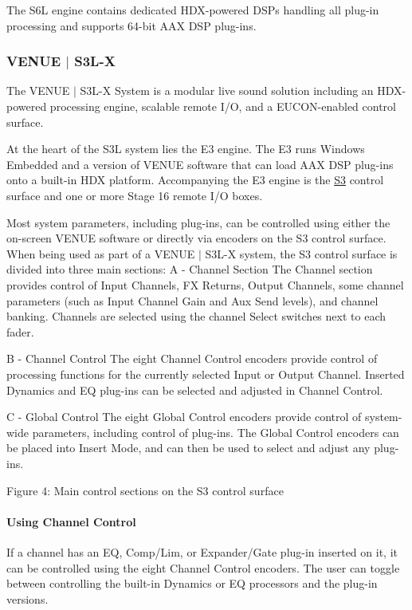  The S6\+L engine contains dedicated H\+D\+X-\/powered D\+S\+Ps handling all plug-\/in processing and supports 64-\/bit A\+A\+X D\+S\+P plug-\/ins.

\hypertarget{a00377_aax_venue_guide__systems__s3l}{}\subsubsection{V\+E\+N\+U\+E $\vert$ S3\+L-\/\+X}\label{a00377_aax_venue_guide__systems__s3l}
 The V\+E\+N\+U\+E $\vert$ S3\+L-\/\+X System is a modular live sound solution including an H\+D\+X-\/powered processing engine, scalable remote I/\+O, and a E\+U\+C\+O\+N-\/enabled control surface.

 At the heart of the S3\+L system lies the E3 engine. The E3 runs Windows Embedded and a version of V\+E\+N\+U\+E software that can load A\+A\+X D\+S\+P plug-\/ins onto a built-\/in H\+D\+X platform. Accompanying the E3 engine is the \hyperlink{a00363_subsubsection__avid_s3}{S3} control surface and one or more Stage 16 remote I/\+O boxes.

 Most system parameters, including plug-\/ins, can be controlled using either the on-\/screen V\+E\+N\+U\+E software or directly via encoders on the S3 control surface. When being used as part of a V\+E\+N\+U\+E $\vert$ S3\+L-\/\+X system, the S3 control surface is divided into three main sections\+: A -\/ Channel Section The Channel section provides control of Input Channels, F\+X Returns, Output Channels, some channel parameters (such as Input Channel Gain and Aux Send levels), and channel banking. Channels are selected using the channel Select switches next to each fader.

 B -\/ Channel Control The eight Channel Control encoders provide control of processing functions for the currently selected Input or Output Channel. Inserted Dynamics and E\+Q plug-\/ins can be selected and adjusted in Channel Control.

 C -\/ Global Control The eight Global Control encoders provide control of system-\/wide parameters, including control of plug-\/ins. The Global Control encoders can be placed into Insert Mode, and can then be used to select and adjust any plug-\/ins.

  Figure 4\+: Main control sections on the S3 control surface

\hypertarget{a00377_aax_venue_guide__systems__s3l__using_channel_control}{}\paragraph{Using Channel Control}\label{a00377_aax_venue_guide__systems__s3l__using_channel_control}
 If a channel has an E\+Q, Comp/\+Lim, or Expander/\+Gate plug-\/in inserted on it, it can be controlled using the eight Channel Control encoders. The user can toggle between controlling the built-\/in Dynamics or E\+Q processors and the plug-\/in versions.

